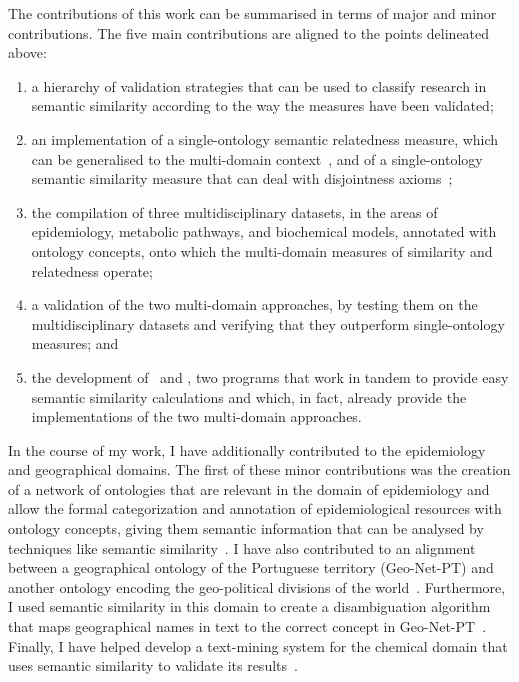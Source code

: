 The contributions of this work can be summarised in terms of major and minor contributions. The five main contributions are aligned to the points delineated above:
\begin{enumerate}
    \item a hierarchy of validation strategies that can be used to classify research in semantic similarity according to the way the measures have been validated;
    \item an implementation of a single-ontology semantic relatedness measure, which can be generalised to the multi-domain context~\citep{Ferreira2011}, and of a single-ontology semantic similarity measure that can deal with disjointness axioms~\citep{Ferreira2013};
    \item the compilation of three multidisciplinary datasets, in the areas of epidemiology, metabolic pathways, and biochemical models, annotated with ontology concepts, onto which the multi-domain measures of similarity and relatedness operate;
    \item a validation of the two multi-domain approaches, by testing them on the multidisciplinary datasets and verifying that they outperform single-ontology measures; and
    \item the development of \owlsql\ and \mossy, two programs that work in tandem to provide easy semantic similarity calculations and which, in fact, already provide the implementations of the two multi-domain approaches.
\end{enumerate}

In the course of my work, I have additionally contributed to the epidemiology and geographical domains. The first of these minor contributions was the creation of a network of ontologies that are relevant in the domain of epidemiology and allow the formal categorization and annotation of epidemiological resources with ontology concepts, giving them semantic information that can be analysed by techniques like semantic similarity~\citep{Ferreira2012}. I have also contributed to an alignment between a geographical ontology of the Portuguese territory (Geo-Net-PT) and another ontology encoding the geo-political divisions of the world~\citep{Ferreira2010a}. Furthermore, I used semantic similarity in this domain to create a disambiguation algorithm that maps geographical names in text to the correct concept in Geo-Net-PT~\citep{Batista2012}. Finally, I have helped develop a text-mining system for the chemical domain that uses semantic similarity to validate its results~\citep{Lamurias2015}.

